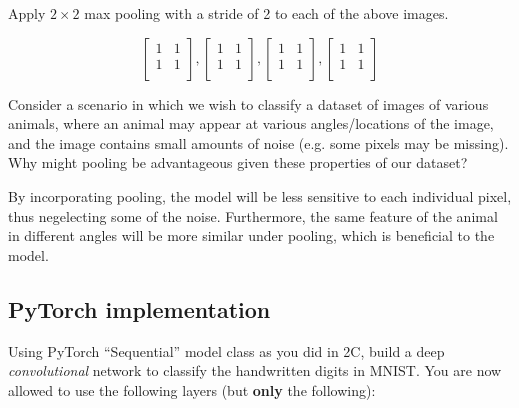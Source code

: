 Apply $2 \times 2$ max pooling with a stride of 2 to each of the above images.

\begin{subsolution}
  $$
  \begin{bmatrix}
    1 & 1 \\
    1 & 1 \\
  \end{bmatrix},
  \begin{bmatrix}
    1 & 1 \\
    1 & 1 \\
  \end{bmatrix},
  \begin{bmatrix}
    1 & 1 \\
    1 & 1 \\
  \end{bmatrix},
  \begin{bmatrix}
    1 & 1 \\
    1 & 1 \\
  \end{bmatrix}
  $$
\end{subsolution}

\problem[4]

Consider a scenario in which we wish to classify a dataset of images of various animals, where an animal may appear at various angles/locations of the image, and the image contains small amounts of noise (e.g. some pixels may be missing). Why might pooling be advantageous given these properties of our dataset?

\begin{subsolution}
  By incorporating pooling, the model will be less sensitive to each individual pixel, thus negelecting some of the noise. Furthermore, the same feature of the animal in different angles will be more similar under pooling, which is beneficial to the model.
\end{subsolution}

\subsection{PyTorch implementation}
\problem[20]

Using PyTorch ``Sequential'' model class as you did in 2C, build a deep \emph{convolutional}
network to classify the handwritten digits in MNIST. You are now allowed to use
the following layers (but \textbf{only} the following):

